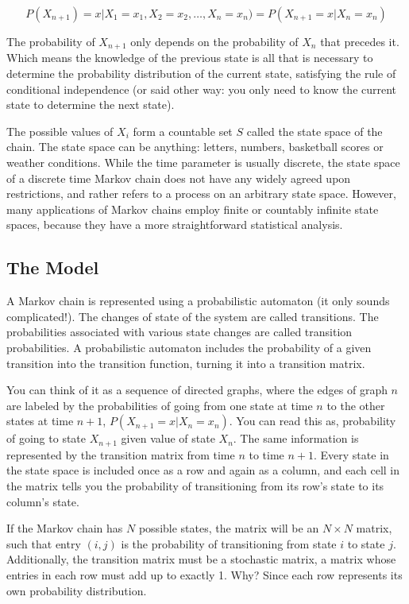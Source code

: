 \begin{equation}
P(X_{n+1}) = x | X_1 = x_1, X_2 = x_2, \ldots, X_n = x_n) = P( X_{n+1} = x | X_n = x_n)
\end{equation}

The probability of $X_{n+1}$ only depends on the probability of $X_n$ that precedes it. Which means the knowledge of the previous state is all that is necessary to determine the probability distribution of the current state, satisfying the rule of conditional independence (or said other way: you only need to know the current state to determine the next state).

The possible values of $X_i$ form a countable set $S$ called the state space of the chain. The state space can be anything: letters, numbers, basketball scores or weather conditions. While the time parameter is usually discrete, the state space of a discrete time Markov chain does not have any widely agreed upon restrictions, and rather refers to a process on an arbitrary state space. However, many applications of Markov chains employ finite or countably infinite state spaces, because they have a more straightforward statistical analysis.

\subsection{The Model}
A Markov chain is represented using a probabilistic automaton (it only sounds complicated!). The changes of state of the system are called transitions. The probabilities associated with various state changes are called transition probabilities. A probabilistic automaton includes the probability of a given transition into the transition function, turning it into a transition matrix.

You can think of it as a sequence of directed graphs, where the edges of graph $n$ are labeled by the probabilities of going from one state at time $n$ to the other states at time $n+1$, $P(X_{n+1} = x | X_n = x_n)$. You can read this as, probability of going to state $X_{n+1}$ given value of state $X_n$. The same information is represented by the transition matrix from time $n$ to time $n+1$. Every state in the state space is included once as a row and again as a column, and each cell in the matrix tells you the probability of transitioning from its row's state to its column's state.

If the Markov chain has $N$ possible states, the matrix will be an $N \times N$ matrix, such that entry $(i, j)$ is the probability of transitioning from state $i$ to state $j$. Additionally, the transition matrix must be a stochastic matrix, a matrix whose entries in each row must add up to exactly 1. Why? Since each row represents its own probability distribution.

